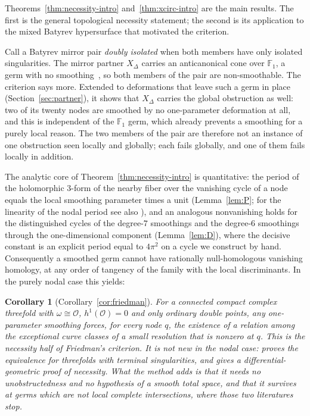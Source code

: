 \documentclass[11pt]{amsart}
\newtheorem{corollary}[theorem]{Corollary}
\theoremstyle{definition}
\theoremstyle{remark}
\theoremstyle{plain}
\newcommand{\cO}{\mathcal{O}}
\begin{document}
Theorems~\ref{thm:necessity-intro} and~\ref{thm:xcirc-intro} are the main
results.  The first is the general topological necessity statement; the second
is its application to the mixed Batyrev hypersurface that motivated the
criterion.

Call a Batyrev mirror pair \emph{doubly isolated} when both members have only
isolated singularities.  The mirror partner
$X_{\Delta}$ carries an anticanonical cone over $\mathbb F_1$, a germ with no
smoothing~\cite{PaperI,PaperIII}, so both members of the pair are
non-smoothable.  The criterion says more.  Extended to deformations
that leave such a germ in place (Section~\ref{sec:partner}), it shows
that $X_{\Delta}$ carries the global obstruction as well: two of its
twenty nodes are smoothed by no one-parameter deformation at all, and
this is
independent of the $\mathbb F_1$ germ, which already prevents a
smoothing for
a purely local reason.  The two members of the pair are therefore not
an instance of one obstruction seen locally and globally; each fails
globally, and one of them fails locally in addition.

The analytic core of Theorem~\ref{thm:necessity-intro} is quantitative: the
period of the holomorphic $3$-form of the nearby fiber over the
vanishing cycle of a node equals the local smoothing parameter times a
unit (Lemma~\ref{lem:P}; for the linearity of the nodal period see
also \cite[(1.4)]{RT09}), and an analogous nonvanishing holds for the
distinguished cycles of the degree-$7$ smoothings and the degree-$6$
smoothings through the one-dimensional component (Lemma~\ref{lem:D}), where
the decisive constant is an
explicit period equal to $4\pi^2$ on a cycle we construct by hand.
Consequently a smoothed germ cannot have rationally null-homologous
vanishing homology, at any order of tangency of the family with the
local discriminants.  In the purely nodal case this yields:

\begin{corollary}[Corollary~\ref{cor:friedman}]\label{cor:friedman-intro}
For a connected compact complex threefold with $\omega\cong\cO$,
$h^1(\cO)=0$ and only ordinary double points, any one-parameter
smoothing forces, for every node $q$, the existence of a relation
among the exceptional curve classes of a small resolution that is
nonzero at $q$.  This is the necessity half of Friedman's criterion.  It is not new in the
nodal case: \cite[Theorem~2.5]{Namikawa02} proves the equivalence for
threefolds with terminal singularities, and \cite[\S4]{Collins25} gives a
differential-geometric proof of necessity.  What the method adds is that it
needs no unobstructedness and no hypothesis of a smooth total space, and
that it survives at germs which are not local complete intersections, where
those two literatures stop.
\end{corollary}
\end{document}
